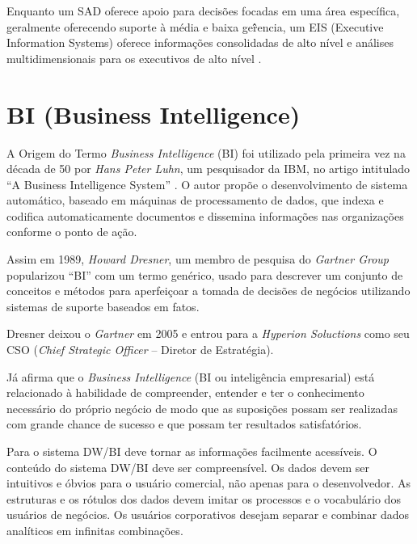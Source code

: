 Enquanto um SAD oferece apoio para decis\~{o}es focadas em uma \'{a}rea espec\'{i}fica, geralmente oferecendo suporte \`{a} m\'{e}dia e baixa ger\^{̂e}ncia, um EIS (Executive Information Systems) oferece informa\c{c}\~{o}es consolidadas de alto n\'{i}vel e an\'{a}lises multidimensionais para os executivos de alto n\'{i}vel \cite{si-gupta-2001}.

\section{BI (Business Intelligence)}

A Origem do Termo \textit{Business Intelligence} (BI) foi utilizado pela primeira vez na d\'{e}cada de 50 por \textit{Hans Peter Luhn}, um pesquisador da IBM, no artigo intitulado “A Business Intelligence System” \cite{bi-elena-2011}. O autor prop\~{o}e o desenvolvimento de sistema autom\'{a}tico, baseado em m\'{a}quinas de processamento de dados, que indexa e codifica automaticamente documentos e dissemina informa\c{c}\~{o}es nas organiza\c{c}\~{o}es conforme o ponto de a\c{c}\~{a}o.

Assim em 1989, \textit{Howard Dresner}, um membro de pesquisa do \textit{Gartner Group} popularizou “BI” com um termo gen\'{e}rico, usado para descrever um conjunto de conceitos e m\'{e}todos para aperfei\c{c}oar a tomada de decis\~{o}es de neg\'{o}cios utilizando sistemas de suporte baseados em fatos.

Dresner deixou o \textit{Gartner} em 2005 e entrou para a \textit{Hyperion Soluctions} como seu CSO (\textit{Chief Strategic Officer} – Diretor de Estrat\'{e}gia).

J\'{a} \cite{bi-cortes-2008} afirma que o \textit{Business Intelligence} (BI ou intelig\^{e}ncia empresarial) est\'{a} relacionado \`{a} habilidade de compreender, entender e ter o conhecimento necess\'{a}rio do pr\'{o}prio neg\'{o}cio de modo que as suposi\c{c}\~{o}es possam ser realizadas com grande chance de sucesso e que possam ter resultados satisfat\'{o}rios.

Para \cite{dw-kimball-2013} o sistema DW/BI deve tornar as informa\c{c}\~{o}es facilmente acess\'{i}veis. O conteúdo do sistema DW/BI deve ser compreens\'{i}vel. Os dados devem ser intuitivos e \'{o}bvios para o usu\'{a}rio comercial, n\~{a}o apenas para o desenvolvedor. As estruturas e os r\'{o}tulos dos dados devem imitar os processos e o vocabul\'{a}rio dos usu\'{a}rios de neg\'{o}cios. Os usu\'{a}rios corporativos desejam separar e combinar dados anal\'{i}ticos em infinitas combina\c{c}\~{o}es.


